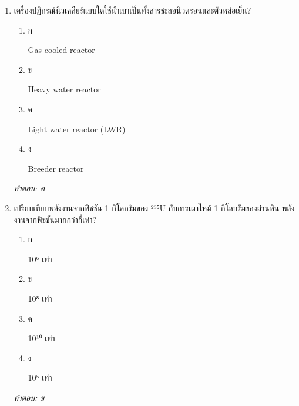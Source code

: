 \documentclass[12pt]{article}
\begin{document}
\begin{enumerate}[label=\arabic*., itemsep=0.5\baselineskip, topsep=0.5\baselineskip, leftmargin=*]
\item เครื่องปฏิกรณ์นิวเคลียร์แบบใดใช้น้ำเบาเป็นทั้งสารชะลอนิวตรอนและตัวหล่อเย็น?
\begin{enumerate}[label=\alph*)., itemsep=0.3\baselineskip, topsep=0.3\baselineskip]
\item ก\ 
\begin{minipage}[t]{0.9\linewidth}
\raggedright Gas-cooled reactor
\end{minipage}
\item ข\ 
\begin{minipage}[t]{0.9\linewidth}
\raggedright Heavy water reactor
\end{minipage}
\item ค\ 
\begin{minipage}[t]{0.9\linewidth}
\raggedright Light water reactor (LWR)
\end{minipage}
\item ง\ 
\begin{minipage}[t]{0.9\linewidth}
\raggedright Breeder reactor
\end{minipage}
\end{enumerate}
\vspace{-0.3\baselineskip}
\begin{small}
\textit{คำตอบ: ค}
\end{small}

\item เปรียบเทียบพลังงานจากฟิชชัน 1 กิโลกรัมของ ²³⁵U กับการเผาไหม้ 1 กิโลกรัมของถ่านหิน พลังงานจากฟิชชันมากกว่ากี่เท่า?
\begin{enumerate}[label=\alph*)., itemsep=0.3\baselineskip, topsep=0.3\baselineskip]
\item ก\ 
\begin{minipage}[t]{0.9\linewidth}
\raggedright 10⁶ เท่า
\end{minipage}
\item ข\ 
\begin{minipage}[t]{0.9\linewidth}
\raggedright 10⁸ เท่า
\end{minipage}
\item ค\ 
\begin{minipage}[t]{0.9\linewidth}
\raggedright 10¹⁰ เท่า
\end{minipage}
\item ง\ 
\begin{minipage}[t]{0.9\linewidth}
\raggedright 10⁵ เท่า
\end{minipage}
\end{enumerate}
\vspace{-0.3\baselineskip}
\begin{small}
\textit{คำตอบ: ข}
\end{small}


\end{enumerate}
\end{document}
